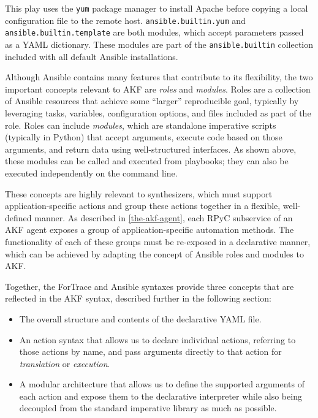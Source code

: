 \documentclass[letterpaper,12pt]{report}
\def\tightlist{}
\newcommand{\passthrough}[1]{#1}
\begin{document}
This play uses the \passthrough{\lstinline!yum!} package manager to
install Apache before copying a local configuration file to the remote
host. \passthrough{\lstinline!ansible.builtin.yum!} and
\passthrough{\lstinline!ansible.builtin.template!} are both modules,
which accept parameters passed as a YAML dictionary. These modules are
part of the \passthrough{\lstinline!ansible.builtin!} collection
included with all default Ansible installations.

Although Ansible contains many features that contribute to its
flexibility, the two important concepts relevant to AKF are \emph{roles}
and \emph{modules}. Roles are a collection of Ansible resources that
achieve some ``larger'' reproducible goal, typically by leveraging
tasks, variables, configuration options, and files included as part of
the role. Roles can include \emph{modules}, which are standalone
imperative scripts (typically in Python) that accept arguments, execute
code based on those arguments, and return data using well-structured
interfaces. As shown above, these modules can be called and executed
from playbooks; they can also be executed independently on the command
line.

These concepts are highly relevant to synthesizers, which must support
application-specific actions and group these actions together in a
flexible, well-defined manner. As described in \autoref{the-akf-agent}, each RPyC subservice of an AKF agent
exposes a group of application-specific automation methods. The
functionality of each of these groups must be re-exposed in a
declarative manner, which can be achieved by adapting the concept of
Ansible roles and modules to AKF.

Together, the ForTrace and Ansible syntaxes provide three concepts that
are reflected in the AKF syntax, described further in the following
section:

\begin{itemize}
\tightlist
\item
  The overall structure and contents of the declarative YAML file.
\item
  An action syntax that allows us to declare individual actions,
  referring to those actions by name, and pass arguments directly to
  that action for \emph{translation} or \emph{execution}.
\item
  A modular architecture that allows us to define the supported
  arguments of each action and expose them to the declarative
  interpreter while also being decoupled from the standard imperative
  library as much as possible.
\end{itemize}
\end{document}
